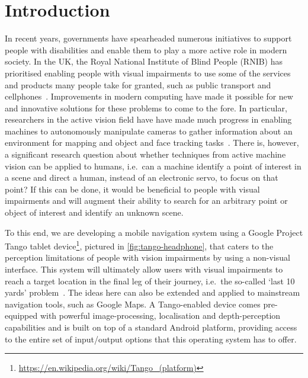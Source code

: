\documentclass[sigconf, screen=true, anonymous=true]{acmart}
\begin{document}
\section{Introduction}

In recent years, governments have spearheaded numerous initiatives to support people with disabilities and enable them to play a more active role in modern society.
In the UK, the Royal National Institute of Blind People (RNIB) has prioritised enabling people with visual impairments to use some of the services and products many people take for granted, such as public transport and cellphones~\cite{rnib-objectives}.
Improvements in modern computing have made it possible for new and innovative solutions for these problems to come to the fore.
In particular, researchers in the active vision field have have made much progress in enabling machines to autonomously manipulate cameras to gather information about an environment for mapping and object and face tracking tasks~\cite{bajcsy2018revisiting}.
There is, however, a significant research question about whether techniques from active machine vision can be applied to humans, i.e.\ can a machine identify a point of interest in a scene and direct a human, instead of an electronic servo, to focus on that point?
If this can be done, it would be beneficial to people with visual impairments and will augment their ability to search for an arbitrary point or object of interest and identify an unknown scene. 

To this end, we are developing a mobile navigation system using a Google Project Tango tablet device\footnote{\url{https://en.wikipedia.org/wiki/Tango_(platform)}}, pictured in \cref{fig:tango-headphone}, that caters to the perception limitations of people with vision impairments by using a non-visual interface.
This system will ultimately allow users with visual impairments to reach a target location in the final leg of their journey, i.e.\ the so-called `last 10 yards' problem~\cite{google2016blind,bellotto2013}. 
The ideas here can also be extended and applied to mainstream navigation tools, such as Google Maps.
A Tango-enabled device comes pre-equipped with powerful image-processing, localisation and depth-perception capabilities and is built on top of a standard Android platform, providing access to the entire set of input/output options that this operating system has to offer.
\end{document}
